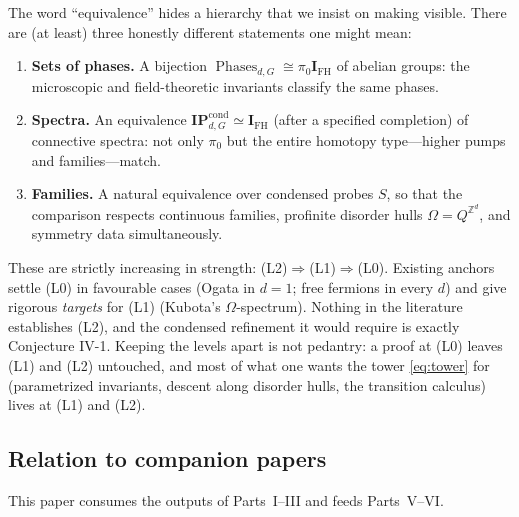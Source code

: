 \documentclass[12pt]{article}
\newcommand{\Phases}{\operatorname{Phases}}    %
\newcommand{\IPcond}{\mathbf{IP}^{\mathrm{cond}}}  %
\newcommand{\dis}{\Omega}                       %
\newcommand{\IFH}{\mathbf{I}_{\mathrm{FH}}}  %
\theoremstyle{definition}
\theoremstyle{remark}
\theoremstyle{plain}
\begin{document}
The word ``equivalence'' hides a hierarchy that we insist on making visible.
There are (at least) three honestly different statements one might mean:
\begin{enumerate}
\item[(L0)] \textbf{Sets of phases.} A bijection $\Phases_{d,G}\cong
  \pi_0\IFH$ of abelian groups: the microscopic and field-theoretic invariants
  classify the same phases.
\item[(L1)] \textbf{Spectra.} An equivalence $\IPcond_{d,G}\simeq\IFH$ (after a
  specified completion) of connective spectra: not only $\pi_0$ but the entire
  homotopy type---higher pumps and families---match.
\item[(L2)] \textbf{Families.} A natural equivalence over condensed probes $S$,
  so that the comparison respects continuous families, profinite disorder hulls
  $\dis=Q^{\mathbb{Z}^d}$, and symmetry data simultaneously.
\end{enumerate}
These are strictly increasing in strength: (L2)$\Rightarrow$(L1)$\Rightarrow$(L0).
Existing anchors settle (L0) in favourable cases (Ogata in $d=1$; free fermions
in every $d$) and give rigorous \emph{targets} for (L1) (Kubota's
$\Omega$-spectrum). Nothing in the literature establishes (L2), and the
condensed refinement it would require is exactly Conjecture IV-1. Keeping the
levels apart is not pedantry: a proof at (L0) leaves (L1) and (L2) untouched, and
most of what one wants the tower \eqref{eq:tower} for (parametrized invariants,
descent along disorder hulls, the transition calculus) lives at (L1) and (L2).

\subsection{Relation to companion papers}
\label{subsec:companions}

This paper consumes the outputs of Parts~I--III and feeds Parts~V--VI.
\end{document}
